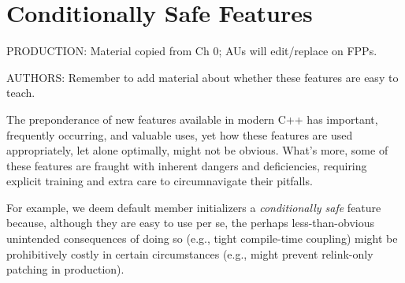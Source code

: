 
\chapter[Conditionally Safe Features]{Conditionally Safe Features}\label{ch-conditional}
\emcppschapterstart{}

PRODUCTION: Material copied from Ch 0; AUs will edit/replace on FPPs. 

AUTHORS: Remember to add material about whether these features are easy to teach. 

The preponderance of new features available in modern C++ has important, frequently occurring, and valuable uses, yet how these features are used appropriately, let alone optimally, might not be obvious. What’s more, some of these features are fraught with inherent dangers and deficiencies, requiring explicit training and extra care to circumnavigate their pitfalls.

For example, we deem default member initializers a \emph{conditionally safe} feature because, although they are easy to use per se, the perhaps less-than-obvious unintended consequences of doing so (e.g., tight compile-time coupling) might be prohibitively costly in certain circumstances (e.g., might prevent relink-only patching in production).

\renewcommand{\cppxx}{C++11}

\newpage
{}


\newpage


\newpage
%


